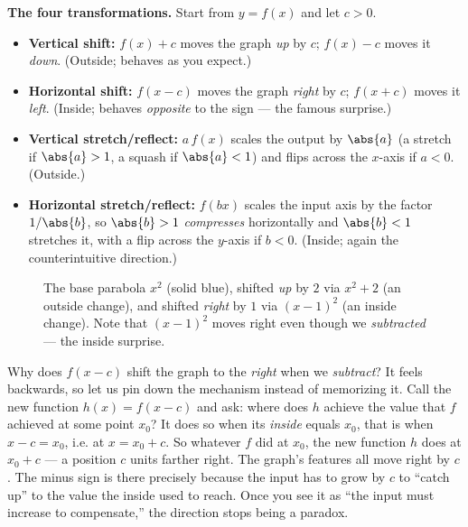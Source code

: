 \begin{focusbox}
\textbf{The four transformations.}\quad
Start from $y = f(x)$ and let $c > 0$.
\begin{itemize}
  \item \textbf{Vertical shift:} $f(x) + c$ moves the graph \emph{up} by $c$;
        $f(x) - c$ moves it \emph{down}. (Outside; behaves as you expect.)
  \item \textbf{Horizontal shift:} $f(x - c)$ moves the graph \emph{right} by $c$;
        $f(x + c)$ moves it \emph{left}. (Inside; behaves \emph{opposite} to the
        sign --- the famous surprise.)
  \item \textbf{Vertical stretch/reflect:} $a\,f(x)$ scales the output by $\abs{a}$
        (a stretch if $\abs{a}>1$, a squash if $\abs{a}<1$) and flips across the
        $x$-axis if $a < 0$. (Outside.)
  \item \textbf{Horizontal stretch/reflect:} $f(bx)$ scales the input axis by the
        factor $1/\abs{b}$, so $\abs{b}>1$ \emph{compresses} horizontally and
        $\abs{b}<1$ stretches it, with a flip across the $y$-axis if $b < 0$.
        (Inside; again the counterintuitive direction.)
\end{itemize}
\end{focusbox}

\begin{figure}[H]
\centering
{}
\caption{The base parabola $x^2$ (solid blue), shifted \emph{up} by $2$ via
$x^2+2$ (an outside change), and shifted \emph{right} by $1$ via $(x-1)^2$ (an
inside change). Note that $(x-1)^2$ moves right even though we \emph{subtracted}
--- the inside surprise.}
\label{ch02:fig-transform}
\end{figure}

\begin{whybox}
Why does $f(x-c)$ shift the graph to the \emph{right} when we \emph{subtract}? It
feels backwards, so let us pin down the mechanism instead of memorizing it. Call
the new function $h(x) = f(x-c)$ and ask: where does $h$ achieve the value that
$f$ achieved at some point $x_0$? It does so when its \emph{inside} equals $x_0$,
that is when $x - c = x_0$, i.e. at $x = x_0 + c$. So whatever $f$ did at $x_0$,
the new function $h$ does at $x_0 + c$ --- a position $c$ units farther right. The
graph's features all move right by $c$. The minus sign is there precisely because
the input has to grow by $c$ to ``catch up'' to the value the inside used to reach.
Once you see it as ``the input must increase to compensate,'' the direction stops
being a paradox.
\end{whybox}

